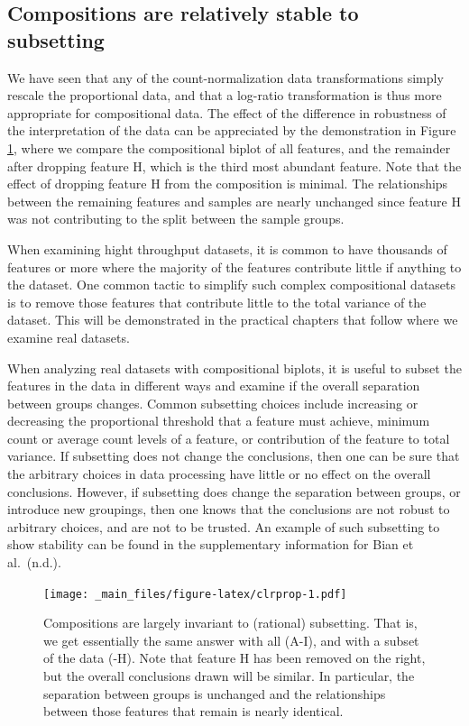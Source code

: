 \documentclass[onecolumn]{article}
\begin{document}
\hypertarget{compositions-are-relatively-stable-to-subsetting}{%
\subsection{Compositions are relatively stable to subsetting}\label{compositions-are-relatively-stable-to-subsetting}}

We have seen that any of the count-normalization data transformations simply rescale the proportional data, and that a log-ratio transformation is thus more appropriate for compositional data. The effect of the difference in robustness of the interpretation of the data can be appreciated by the demonstration in Figure \ref{fig:clrprop}, where we compare the compositional biplot of all features, and the remainder after dropping feature H, which is the third most abundant feature. Note that the effect of dropping feature H from the composition is minimal. The relationships between the remaining features and samples are nearly unchanged since feature H was not contributing to the split between the sample groups.

When examining hight throughput datasets, it is common to have thousands of features or more where the majority of the features contribute little if anything to the dataset. One common tactic to simplify such complex compositional datasets is to remove those features that contribute little to the total variance of the dataset. This will be demonstrated in the practical chapters that follow where we examine real datasets.

When analyzing real datasets with compositional biplots, it is useful to subset the features in the data in different ways and examine if the overall separation between groups changes. Common subsetting choices include increasing or decreasing the proportional threshold that a feature must achieve, minimum count or average count levels of a feature, or contribution of the feature to total variance. If subsetting does not change the conclusions, then one can be sure that the arbitrary choices in data processing have little or no effect on the overall conclusions. However, if subsetting does change the separation between groups, or introduce new groupings, then one knows that the conclusions are not robust to arbitrary choices, and are not to be trusted. An example of such subsetting to show stability can be found in the supplementary information for Bian et al.~(n.d.).

\begin{figure}
\centering
\texttt{[image: \_main\_files/figure-latex/clrprop-1.pdf]}
\caption{\label{fig:clrprop}Compositions are largely invariant to (rational) subsetting. That is, we get essentially the same answer with all (A-I), and with a subset of the data (-H). Note that feature H has been removed on the right, but the overall conclusions drawn will be similar. In particular, the separation between groups is unchanged and the relationships between those features that remain is nearly identical.}
\end{figure}
\end{document}
